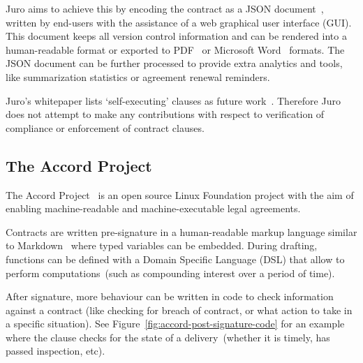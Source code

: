 Juro aims to achieve this by encoding the contract as a JSON document~\cite{jsonSpec}, written by end-users
with the assistance of a web graphical user interface (GUI).
This document keeps all version control information and can be rendered into a human-readable format or exported
to PDF~\cite{pdf2020spec} or Microsoft Word~\cite{microsoftWordWeb} formats.
The JSON document can be further processed to provide extra analytics and tools, like summarization statistics or
agreement renewal reminders.

Juro's whitepaper lists `self-executing' clauses as future work~\cite[p.~6]{juroWhitepaper}.
Therefore Juro does not attempt to make any contributions with respect to verification of compliance or enforcement of
contract clauses.

\subsection{The Accord Project}\label{subsec:accord}

The Accord Project~\cite{accordHomepage} is an open source Linux Foundation project with the aim of enabling
machine-readable and machine-executable legal agreements.

Contracts are written pre-signature in a human-readable markup language similar to Markdown~\cite{markdownSpec}
where typed variables can be embedded.
During drafting, functions can be defined with a Domain Specific Language (DSL) that allow to perform
computations~(such as compounding interest over a period of time).

After signature, more behaviour can be written in code to check information against a contract (like checking for
breach of contract, or what action to take in a specific situation).
See Figure~\ref{fig:accord-post-signature-code} for an example where the clause checks for the state of a
delivery~(whether it is timely, has passed inspection, etc).


